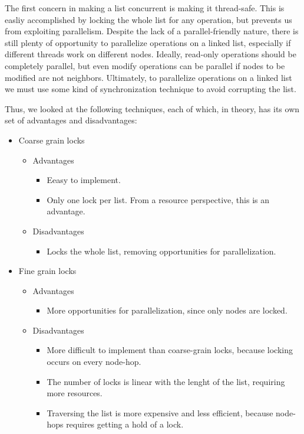 \documentclass[11pt]{article}
\begin{document}
The first concern in making a list concurrent is making it thread-safe. This is
easliy accomplished by locking the whole list for any operation, but prevents us
from exploiting parallelism. Despite the lack of a parallel-friendly nature,
there is still plenty of opportunity to parallelize operations on a linked list,
especially if different threads work on different nodes. Ideally, read-only
operations should be completely parallel, but even modify operations can be
parallel if nodes to be modified are not neighbors. Ultimately, to parallelize
operations on a linked list we must use some kind of synchronization technique
to avoid corrupting the list.

Thus, we looked at the following techniques, each of which, in theory, has its
own set of advantages and disadvantages:

\begin{itemize}
\item Coarse grain locks
\begin{itemize}
\item Advantages
\begin{itemize}
\item Eeasy to implement.
\item Only one lock per list. From a resource perspective, this is an advantage.
\end{itemize}
\item Disadvantages
\begin{itemize}
\item Locks the whole list, removing opportunities for parallelization.
\end{itemize}
\end{itemize}

\item Fine grain locks
\begin{itemize}
\item Advantages
\begin{itemize}
\item More opportunities for parallelization, since only nodes are locked.
\end{itemize}
\item Disadvantages
\begin{itemize}
\item
More difficult to implement than coarse-grain locks, because locking occurs on
every node-hop.
\item
The number of locks is linear with the lenght of the list, requiring more
resources.
\item
Traversing the list is more expensive and less efficient, because node-hops
requires getting a hold of a lock.
\end{itemize}
\end{itemize}


\end{itemize}
\end{document}

